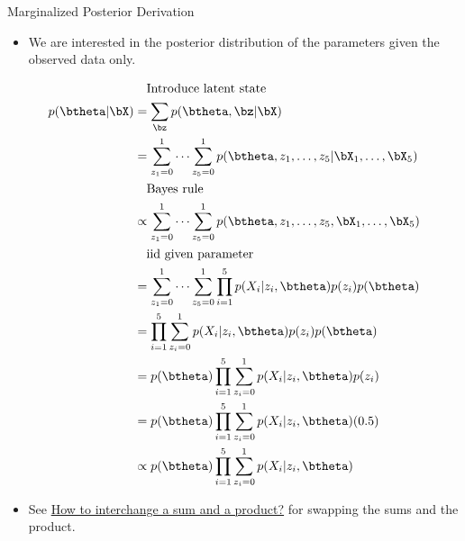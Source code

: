 \documentclass[dvipdfmx,bigger,aspectratio=169]{beamer}
\begin{document}
\begin{frame}[allowframebreaks,label=,t]{Marginalized Posterior Derivation}
\begin{itemize}
\item We are interested in the posterior distribution of the parameters given the observed data only.
\end{itemize}
\begin{align*}
  &~~~\text{Introduce latent state}\\
  p(\btheta | \bX)
  &= \sum_{\bz} p(\btheta, \bz | \bX)\\
  &= \sum^{1}_{z_{1}=0}\dots\sum^{1}_{z_{5}=0} p(\btheta, z_{1},\dots,z_{5} | \bX_{1},\dots,\bX_{5})\\
  &~~~\text{Bayes rule}\\
  &\propto \sum^{1}_{z_{1}=0}\dots\sum^{1}_{z_{5}=0} p(\btheta, z_{1},\dots,z_{5}, \bX_{1},\dots,\bX_{5})\\
  &~~~\text{iid given parameter}\\
  &= \sum^{1}_{z_{1}=0}\dots\sum^{1}_{z_{5}=0} \prod^{5}_{i=1}p(X_{i} | z_{i},\btheta) p(z_{i}) p(\btheta)\\
  &= \prod^{5}_{i=1} \sum^{1}_{z_{i}=0} p(X_{i} | z_{i},\btheta) p(z_{i}) p(\btheta)\\
  &= p(\btheta) \prod^{5}_{i=1} \sum^{1}_{z_{i}=0} p(X_{i} | z_{i},\btheta) p(z_{i})\\
  &= p(\btheta) \prod^{5}_{i=1} \sum^{1}_{z_{i}=0} p(X_{i} | z_{i}, \btheta) (0.5)\\
  &\propto p(\btheta) \prod^{5}_{i=1} \sum^{1}_{z_{i}=0} p(X_{i} | z_{i}, \btheta)
\end{align*}
\begin{itemize}
\item See \href{https://math.stackexchange.com/questions/705945/how-to-interchange-a-sum-and-a-product}{How to interchange a sum and a product?} for swapping the sums and the product.
\end{itemize}
\end{frame}
\end{document}
